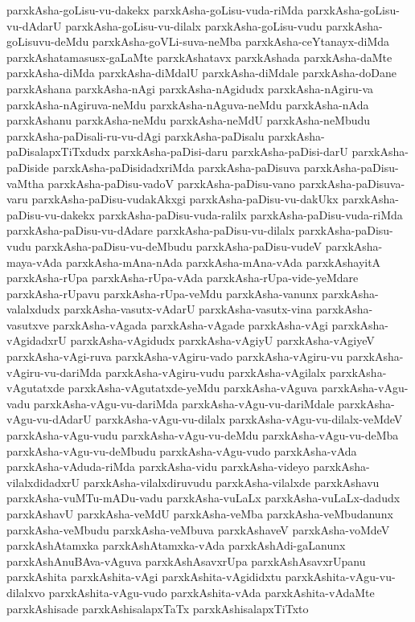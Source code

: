 {parxkAsha-goLisu-vu-dakekx
parxkAsha-goLisu-vuda-riMda
parxkAsha-goLisu-vu-dAdarU
parxkAsha-goLisu-vu-dilalx
parxkAsha-goLisu-vudu
parxkAsha-goLisuvu-deMdu
parxkAsha-goVLi-suva-neMba
parxkAsha-ceYtanayx-diMda
parxkAshatamasusx-gaLaMte
parxkAshatavx
parxkAshada
parxkAsha-daMte
parxkAsha-diMda
parxkAsha-diMdalU
parxkAsha-diMdale
parxkAsha-doDane
parxkAshana
parxkAsha-nAgi
parxkAsha-nAgidudx
parxkAsha-nAgiru-va
parxkAsha-nAgiruva-neMdu
parxkAsha-nAguva-neMdu
parxkAsha-nAda
parxkAshanu
parxkAsha-neMdu
parxkAsha-neMdU
parxkAsha-neMbudu
parxkAsha-paDisali-ru-vu-dAgi
parxkAsha-paDisalu
parxkAsha-paDisalapxTiTxdudx
parxkAsha-paDisi-daru
parxkAsha-paDisi-darU
parxkAsha-paDiside
parxkAsha-paDisidadxriMda
parxkAsha-paDisuva
parxkAsha-paDisu-vaMtha
parxkAsha-paDisu-vadoV
parxkAsha-paDisu-vano
parxkAsha-paDisuva-varu
parxkAsha-paDisu-vudakAkxgi
parxkAsha-paDisu-vu-dakUkx
parxkAsha-paDisu-vu-dakekx
parxkAsha-paDisu-vuda-ralilx
parxkAsha-paDisu-vuda-riMda
parxkAsha-paDisu-vu-dAdare
parxkAsha-paDisu-vu-dilalx
parxkAsha-paDisu-vudu
parxkAsha-paDisu-vu-deMbudu
parxkAsha-paDisu-vudeV
parxkAsha-maya-vAda
parxkAsha-mAna-nAda
parxkAsha-mAna-vAda
parxkAshayitA
parxkAsha-rUpa
parxkAsha-rUpa-vAda
parxkAsha-rUpa-vide-yeMdare
parxkAsha-rUpavu
parxkAsha-rUpa-veMdu
parxkAsha-vanunx
parxkAsha-valalxdudx
parxkAsha-vasutx-vAdarU
parxkAsha-vasutx-vina
parxkAsha-vasutxve
parxkAsha-vAgada
parxkAsha-vAgade
parxkAsha-vAgi
parxkAsha-vAgidadxrU
parxkAsha-vAgidudx
parxkAsha-vAgiyU
parxkAsha-vAgiyeV
parxkAsha-vAgi-ruva
parxkAsha-vAgiru-vado
parxkAsha-vAgiru-vu
parxkAsha-vAgiru-vu-dariMda
parxkAsha-vAgiru-vudu
parxkAsha-vAgilalx
parxkAsha-vAgutatxde
parxkAsha-vAgutatxde-yeMdu
parxkAsha-vAguva
parxkAsha-vAgu-vadu
parxkAsha-vAgu-vu-dariMda
parxkAsha-vAgu-vu-dariMdale
parxkAsha-vAgu-vu-dAdarU
parxkAsha-vAgu-vu-dilalx
parxkAsha-vAgu-vu-dilalx-veMdeV
parxkAsha-vAgu-vudu
parxkAsha-vAgu-vu-deMdu
parxkAsha-vAgu-vu-deMba
parxkAsha-vAgu-vu-deMbudu
parxkAsha-vAgu-vudo
parxkAsha-vAda
parxkAsha-vAduda-riMda
parxkAsha-vidu
parxkAsha-videyo
parxkAsha-vilalxdidadxrU
parxkAsha-vilalxdiruvudu
parxkAsha-vilalxde
parxkAshavu
parxkAsha-vuMTu-mADu-vadu
parxkAsha-vuLaLx
parxkAsha-vuLaLx-dadudx
parxkAshavU
parxkAsha-veMdU
parxkAsha-veMba
parxkAsha-veMbudanunx
parxkAsha-veMbudu
parxkAsha-veMbuva
parxkAshaveV
parxkAsha-voMdeV
parxkAshAtamxka
parxkAshAtamxka-vAda
parxkAshAdi-gaLanunx
parxkAshAnuBAva-vAguva
parxkAshAsavxrUpa
parxkAshAsavxrUpanu
parxkAshita
parxkAshita-vAgi
parxkAshita-vAgididxtu
parxkAshita-vAgu-vu-dilalxvo
parxkAshita-vAgu-vudo
parxkAshita-vAda
parxkAshita-vAdaMte
parxkAshisade
parxkAshisalapxTaTx
parxkAshisalapxTiTxto
}
